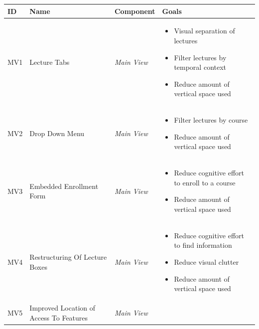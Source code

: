 \cleardoublepage
\renewcommand*{\arraystretch}{1.5}
\begin{longtable}{ | p{0.7cm} | p{2.8cm} | p{2cm} | p{7.6cm} |}
	\hline
	ID & Name & Component & Goals \\ \hline
	MV1 & Lecture Tabs & \emph{Main View}& 
	\vspace{-0.45cm}
	\begin{itemize}[leftmargin=*,noitemsep, topsep=0pt,  partopsep=0pt]
		\item Visual separation of lectures
		\item Filter lectures by temporal context
		\item Reduce amount of vertical space used
	\end{itemize} \vspace{-0.45cm} \\ \hline
	MV2 & Drop Down Menu & \emph{Main View} & 
	\vspace{-0.45cm}
	\begin{itemize}[leftmargin=*,noitemsep, topsep=0pt]
		\item Filter lectures by course
		\item Reduce amount of vertical space used
	\end{itemize} \vspace{-0.45cm} \\ \hline
	MV3 & Embedded Enrollment Form &\emph{Main View} &
	\vspace{-0.45cm}
	\begin{itemize}[leftmargin=*,noitemsep, topsep=0pt]
		\item Reduce cognitive effort to enroll to a course
		\item Reduce amount of vertical space used
	\end{itemize} \vspace{-0.45cm} \\ \hline
	MV4 & Restructuring Of Lecture Boxes &\emph{Main View} &
	\vspace{-0.45cm}	
	\begin{itemize}[leftmargin=*,noitemsep, topsep=0pt]
		\item Reduce cognitive effort to find information
		\item Reduce visual clutter
		\item Reduce amount of vertical space used
	\end{itemize} \vspace{-0.45cm} \\ \hline
	MV5 & Improved Location of Access To Features &\emph{Main View} &

\end{longtable}
